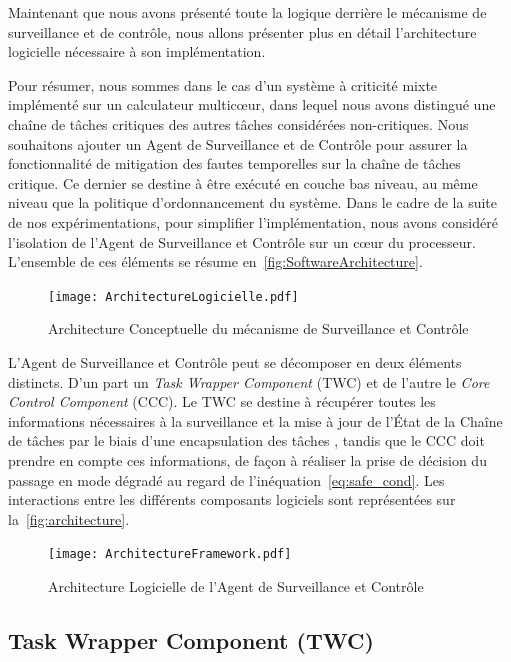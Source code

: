 \documentclass[french, a4paper, 11pt, twoside, pdftex]{StyleThese}
\begin{document}
	Maintenant que nous avons présenté toute la logique derrière le mécanisme de surveillance et de contrôle, nous allons présenter plus en détail l'architecture logicielle nécessaire à son implémentation.
	
	Pour résumer, nous sommes dans le cas d'un système à criticité mixte implémenté sur un calculateur multicœur, dans lequel nous avons distingué une chaîne de tâches critiques des autres tâches considérées non-critiques. Nous souhaitons ajouter un Agent de Surveillance et de Contrôle pour assurer la fonctionnalité de mitigation des fautes temporelles sur la chaîne de tâches critique. Ce dernier se destine à être exécuté en couche bas niveau, au même niveau que la politique d'ordonnancement du système. Dans le cadre de la suite de nos expérimentations, pour simplifier l'implémentation, nous avons considéré l'isolation de l'Agent de Surveillance et Contrôle sur un cœur du processeur. L'ensemble de ces éléments se résume en~\autoref{fig:SoftwareArchitecture}.

	\begin{figure}[ht]
        \centering
        \texttt{[image: ArchitectureLogicielle.pdf]}
        \caption{Architecture Conceptuelle du mécanisme de Surveillance et Contrôle} \label{fig:SoftwareArchitecture}
	\end{figure}

	L'Agent de Surveillance et Contrôle peut se décomposer en deux éléments distincts. D'un part un \emph{Task Wrapper Component} (TWC) et de l'autre le \emph{Core Control Component} (CCC). Le TWC se destine à récupérer toutes les informations nécessaires à la surveillance et la mise à jour de l'État de la Chaîne de tâches par le biais d'une encapsulation des tâches , tandis que le CCC doit prendre en compte ces informations, de façon à réaliser la prise de décision du passage en mode dégradé au regard de l'inéquation~\ref{eq:safe_cond}. Les interactions entre les différents composants logiciels sont représentées sur la~\autoref{fig:architecture}.
	
	
        \begin{figure}[ht!]
            \centering
            \texttt{[image: ArchitectureFramework.pdf]}
            \caption{Architecture Logicielle de l'Agent de Surveillance et Contrôle}
            \label{fig:architecture}
        \end{figure}
        
        
        \subsection{Task Wrapper Component (TWC)} 
        
\end{document}
